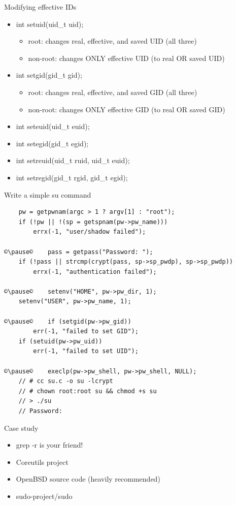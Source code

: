 \documentclass[xcolor={rgb}]{beamer}
\newcommand{\pitem}{\pause\item}
\begin{document}
	\begin{frame}[fragile]{Modifying effective IDs}
	\begin{itemize}
	    \pitem int setuid(uid\_t uid);
	    \begin{itemize}
		\pitem root: changes real, effective, and saved UID (all three)
		\pitem non-root: changes ONLY effective UID (to real OR saved UID)
	    \end{itemize}
	    \pitem int setgid(gid\_t gid);
	    \begin{itemize}
		\pitem root: changes real, effective, and saved GID (all three)
		\pitem non-root: changes ONLY effective GID (to real OR saved GID)
	    \end{itemize}
	    \pitem int seteuid(uid\_t euid);
	    \pitem int setegid(gid\_t egid);
	    \pitem int setreuid(uid\_t ruid, uid\_t euid);
	    \pitem int setregid(gid\_t rgid, gid\_t egid);
	\end{itemize}
	\end{frame}

	\begin{frame}[fragile]{Write a simple su command}
		\begin{verbatim}
    pw = getpwnam(argc > 1 ? argv[1] : "root");
    if (!pw || !(sp = getspnam(pw->pw_name)))
        errx(-1, "user/shadow failed");

©\pause©    pass = getpass("Password: ");
    if (!pass || strcmp(crypt(pass, sp->sp_pwdp), sp->sp_pwdp))
        errx(-1, "authentication failed");
    
©\pause©    setenv("HOME", pw->pw_dir, 1);
    setenv("USER", pw->pw_name, 1);

©\pause©    if (setgid(pw->pw_gid))
        err(-1, "failed to set GID");
    if (setuid(pw->pw_uid))
        err(-1, "failed to set UID");

©\pause©    execlp(pw->pw_shell, pw->pw_shell, NULL);
    // # cc su.c -o su -lcrypt
    // # chown root:root su && chmod +s su
    // > ./su 
    // Password: 
		\end{verbatim}
	\end{frame}

	\begin{frame}{Case study}
	\begin{itemize}
		\pitem grep -r is your friend!
		\pitem Coreutils project
		\pitem OpenBSD source code (heavily recommended)
		\pitem sudo-project/sudo
	\end{itemize}
	\end{frame}
\end{document}
